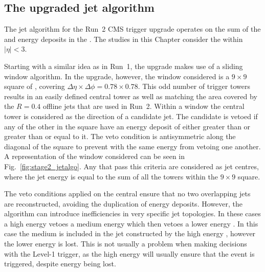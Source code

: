 \subsection{The upgraded jet algorithm}
\label{sec:stage2_jetalgo}

The jet algorithm for the Run~2 CMS trigger upgrade operates on
the sum of the \ECAL and \HCAL energy deposits in the \TTs. The studies
in this Chapter consider the \TTs within $|\eta|<3$.

Starting with a similar idea as in Run~1, the upgrade makes use of a
sliding window algorithm. In the upgrade, however, the window
considered is a $9\times9$ square of \TTs, covering
$\Delta\eta\times\Delta\phi = 0.78 \times 0.78$. This odd number of
trigger towers results in an easily defined central tower as well as
matching the area covered by the $R=0.4$ offline jets that are used in
Run~2. Within a window the central tower is considered as the
direction of a candidate jet. The candidate is vetoed if any of the
other \TTs in the square have an energy deposit of either greater than
or greater than or equal to it. The veto condition is
antisymmetric along the diagonal of the square to prevent \TTs with the
same energy from vetoing one another. A representation of the window
considered can be seen in Fig.~\ref{fig:stage2_jetalgo}.  Any \TTs that
pass this criteria are considered as jet centres, where the jet energy
is equal to the sum of all the towers within the $9\times9$ square.

The veto conditions applied on the central \TT ensure that no two
overlapping jets are reconstructed, avoiding the duplication of energy
deposits. However, the algorithm can introduce inefficiencies in very
specific jet topologies. In these cases a high energy \TT vetoes a
medium energy \TT which then vetoes a lower energy \TT. In this case
the medium \TT is included in the jet constructed by the high energy
\TT, however the lower energy \TT is lost. This is not usually a
problem when making decisions with the Level-1 trigger, as the high
energy \TT will usually ensure that the event is triggered, despite
energy being lost.

